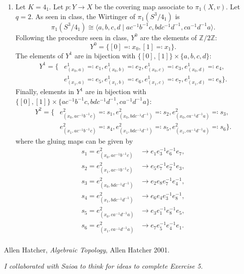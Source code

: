 \documentclass[11pt,a4paper]{article}
\newcommand{\Z}{\mathbb Z}
\begin{document}
\begin{enumerate}[label=\alph*)]
  \item Let $ K = 4_1 $. Let $ p: Y \to X $ be the covering map associate to $\pi_1(X, v) $. Let $ q = 2 $. As seen in class, the Wirtinger of $ \pi_1(S^3/4_1) $ is
  $$
    \pi_1(S^3/4_1) \cong \langle a, b, c, d \mid a c^{-1} b^{-1} c, b d c^{-1} d^{-1}, c a^{-1} d^{-1} a \rangle.
  $$
  Following the procedure seen in class, $ Y^0 $ are the elements of $ \Z / 2\Z $:
  $$
    Y^0 = \{ [0] \eqcolon x_0, [1] \eqcolon x_1\}.
  $$
  The elements of $Y^1$ are in bijection with $ \{ [0], [1] \} \times \{a, b, c, d\} $:
  \begin{align*}
    Y^1 = \bigl\{&e^1_{(x_0, a)} \eqcolon e_1, e^1_{(x_0, b)} \eqcolon e_2, e^1_{(x_0, c)} \eqcolon e_3, e^1_{(x_0, d)} \eqcolon e_4, \\
    &e^1_{(x_1, a)} \eqcolon e_5, e^1_{(x_1, b)} \eqcolon e_6, e^1_{(x_1, c)} \eqcolon e_7, e^1_{(x_1, d)} \eqcolon e_8\bigr\}.
  \end{align*}
  Finally, elements in $Y^1$ are in bijection with $ \{ [0], [1] \} \times \{a c^{-1} b^{-1} c, b d c^{-1} d^{-1}, c a^{-1} d^{-1} a\} $:
  \begin{align*}
    Y^2 = \bigl\{&e^2_{(x_0, a c^{-1} b^{-1} c)} \eqcolon s_1, e^2_{(x_0, b d c^{-1} d^{-1})} \eqcolon s_2, e^2_{(x_0, c a^{-1} d^{-1} a)} \eqcolon s_3, \\
    &e^2_{(x_1, a c^{-1} b^{-1} c)} \eqcolon s_4, e^2_{(x_1, b d c^{-1} d^{-1})} \eqcolon s_5, e^2_{(x_1, c a^{-1} d^{-1} a)} \eqcolon s_6\bigr\}.
  \end{align*}
  where the gluing maps can be given by
  \begin{align*}
    s_1 = e^2_{(x_0, a c^{-1} b^{-1} c)} &\longrightarrow e_1 e_3^{-1} e_6^{-1} e_7, \\
    s_2 = e^2_{(x_1, a c^{-1} b^{-1} c)} &\longrightarrow e_5 e_7^{-1} e_2^{-1} e_3, \\
    s_3 = e^2_{(x_0, b d c^{-1} d^{-1})} &\longrightarrow e_2 e_8 e_7^{-1} e_4^{-1}, \\
    s_4 = e^2_{(x_1, b d c^{-1} d^{-1})} &\longrightarrow e_6 e_4 e_3^{-1} e_8^{-1}, \\
    s_5 = e^2_{(x_0, c a^{-1} d^{-1} a)} &\longrightarrow e_3 e_1^{-1} e_8^{-1} e_5, \\
    s_6 = e^2_{(x_1, c a^{-1} d^{-1} a)} &\longrightarrow e_7 e_5^{-1} e_4^{-1} e_1.\\
  \end{align*}
  \end{enumerate}

\begin{thebibliography}{9}

  Allen Hatcher,
  \textit{Algebraic Topology},
  Allen Hatcher 2001.

  \textit{I collaborated with Saioa to think for ideas to complete Exercise 5.}

\end{thebibliography}
\end{document}

